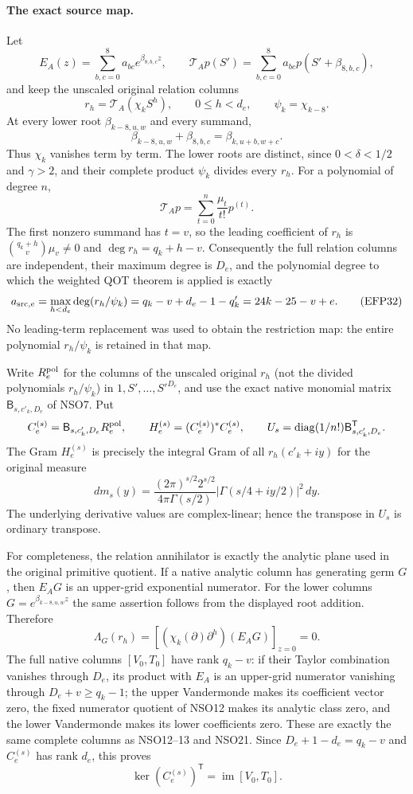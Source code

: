 \documentclass[11pt,a4paper]{article}
\begin{document}
\paragraph{The exact source map.}
Let
\[
 E_A(z)=\sum_{b,c=0}^8a_{bc}e^{\beta_{8,b,c}z},\qquad
 \mathcal T_Ap(S')=\sum_{b,c=0}^8a_{bc}p(S'+\beta_{8,b,c}),
\]
and keep the unscaled original relation columns
\[
 r_h=\mathcal T_A(\chi_kS^h),\qquad 0\le h<d_e,
 \qquad \psi_k=\chi_{k-8}.
\]
At every lower root $\beta_{k-8,u,w}$ and every summand,
\[
 \beta_{k-8,u,w}+\beta_{8,b,c}=\beta_{k,u+b,w+c}.
\]
Thus $\chi_k$ vanishes term by term. The lower roots are distinct, since
$0<\delta<1/2$ and $\gamma>2$, and their complete product $\psi_k$
divides every $r_h$. For a polynomial of degree $n$,
\[
 \mathcal T_Ap
   =\sum_{t=0}^n\frac{\mu_t}{t!}p^{(t)}.
\]
The first nonzero summand has $t=v$, so the leading coefficient of $r_h$
is $\binom{q_k+h}{v}\mu_v\ne0$ and
$\deg r_h=q_k+h-v$. Consequently the full relation columns are independent,
their maximum degree is $D_e$, and the polynomial degree to which the
weighted QOT theorem is applied is exactly
\begin{equation}
 a_{{\rm src},e}
 =\max_{h<d_e}\deg(r_h/\psi_k)
 =q_k-v+d_e-1-q'_k
 =24k-25-v+e.
 \tag{EFP32}
\label{epr:eq:source-degree}
\end{equation}
No leading-term replacement was used to obtain the restriction map:
the entire polynomial $r_h/\psi_k$ is retained in that map.

Write $R_e^{\rm pol}$ for the columns of the unscaled original $r_h$
(not the divided polynomials $r_h/\psi_k$) in
$1,S',\ldots,S'^{D_e}$, and use the exact native monomial matrix
$\mathsf B_{s,c'_k,D_e}$ of NSO7. Put
\[
 C_e^{(s)}=\mathsf B_{s,c'_k,D_e}R_e^{\rm pol},\qquad
 H_e^{(s)}=(C_e^{(s)})^*C_e^{(s)},\qquad
 U_s=\operatorname{diag}(1/n!)\mathsf B_{s,c'_k,D_e}^{\mathsf T}.
\]
The Gram $H_e^{(s)}$ is precisely the integral Gram of all $r_h(c'_k+iy)$
for the original measure
\[
 dm_s(y)=\frac{(2\pi)^{s/2}2^{s/2}}{4\pi\Gamma(s/2)}
       |\Gamma(s/4+iy/2)|^2\,dy .
\]
The underlying derivative values are complex-linear; hence
the transpose in $U_s$ is ordinary transpose.

For completeness, the relation annihilator is exactly the analytic plane
used in the original primitive quotient. If a native analytic column has
generating germ $G$, then $E_AG$ is an upper-grid exponential numerator.
For the lower columns $G=e^{\beta_{k-8,u,w}z}$ the same assertion follows
from the displayed root addition. Therefore
\[
 \Lambda_G(r_h)
   =\left[(\chi_k(\partial)\partial^h)(E_AG)\right]_{z=0}=0 .
\]
The full native columns $[V_0,T_0]$ have rank $q_k-v$:
if their Taylor combination vanishes through $D_e$, its product with $E_A$
is an upper-grid numerator vanishing through $D_e+v\ge q_k-1$;
the upper Vandermonde makes its coefficient vector zero, the fixed
numerator quotient of NSO12 makes its analytic class zero, and the lower
Vandermonde makes its lower coefficients zero. These are exactly the
same complete columns as NSO12--13 and NSO21. Since
$D_e+1-d_e=q_k-v$ and $C_e^{(s)}$ has rank $d_e$, this proves
\[
 \ker (C_e^{(s)})^{\mathsf T}=\operatorname{im}[V_0,T_0].
\]
\end{document}
